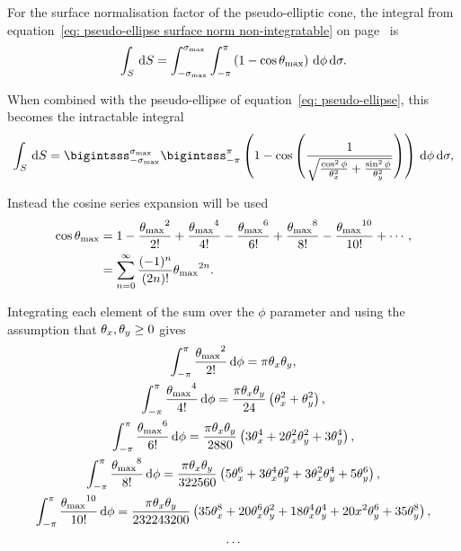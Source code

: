For the surface normalisation factor of the pseudo-elliptic cone, the integral from equation~\ref{eq: pseudo-ellipse surface norm non-integratable} on page~\pageref{eq: pseudo-ellipse surface norm non-integratable} is
\begin{equation}
    \int_S \,\mathrm{d} S = \int_{-\sigma_\textrm{max}}^{\sigma_\textrm{max}} \int_{-\pi}^{\pi} \left( 1 - \cos\theta_\textrm{max} \right) \,\mathrm{d}\phi \,\mathrm{d}\sigma .
\end{equation}

When combined with the pseudo-ellipse of equation~\ref{eq: pseudo-ellipse}, this becomes the intractable integral
\begin{equation}
    \int_S \diff S = \bigintsss_{-\conesmax}^{\conesmax} \bigintsss_{-\pi}^{\pi} \left( 1 - \cos \left( \frac{1}{\sqrt{\frac{\cos^2\phi}{\conethetax^2} + \frac{\sin^2\phi}{\conethetay^2}}} \right) \right) \diff\phi \diff\sigma ,
\end{equation}

Instead the cosine series expansion will be used
\begin{align}
    \cos \theta_\textrm{max} &= 1 - \frac{{\theta_\textrm{max}}^2}{2!} + \frac{{\theta_\textrm{max}}^4}{4!} - \frac{{\theta_\textrm{max}}^6}{6!} + \frac{{\theta_\textrm{max}}^8}{8!} - \frac{{\theta_\textrm{max}}^{10}}{10!} + \cdots , \\
                       &= \sum_{n=0}^\infty \frac{(-1)^n}{(2n)!} {\theta_\textrm{max}}^{2n} .
\end{align}

Integrating each element of the sum over the $\phi$ parameter and using the assumption that $\theta_x, \theta_y \ge 0$ gives
\begin{gather}
    \int_{-\pi}^{\pi} \frac{{\theta_\textrm{max}}^2}{2!} \,\mathrm{d}\phi = \pi \theta_x \theta_y , \nonumber \\
    \int_{-\pi}^{\pi} \frac{{\theta_\textrm{max}}^4}{4!} \,\mathrm{d}\phi = \frac{\pi \theta_x \theta_y}{24} \left( \theta_x ^2 + \theta_y^2 \right) , \nonumber \\
    \int_{-\pi}^{\pi} \frac{{\theta_\textrm{max}}^6}{6!} \,\mathrm{d}\phi = \frac{\pi \theta_x \theta_y}{2880} \left( 3\theta_x ^4 + 2\theta_x ^2\theta_y^2 + 3\theta_y^4 \right) , \nonumber \\
    \int_{-\pi}^{\pi} \frac{{\theta_\textrm{max}}^8}{8!} \,\mathrm{d}\phi = \frac{\pi \theta_x \theta_y}{322560} \left( 5\theta_x ^6 + 3\theta_x ^4\theta_y^2 + 3\theta_x ^2\theta_y^4 + 5\theta_y^6 \right) , \nonumber \\
    \int_{-\pi}^{\pi} \frac{{\theta_\textrm{max}}^{10}}{10!} \,\mathrm{d}\phi = \frac{\pi \theta_x \theta_y}{232243200} \left( 35\theta_x ^8 + 20\theta_x ^6\theta_y^2 + 18\theta_x ^4\theta_y^4 + 20x^2\theta_y^6 + 35\theta_y^8 \right) , \nonumber \\
    \dots
\end{gather}

